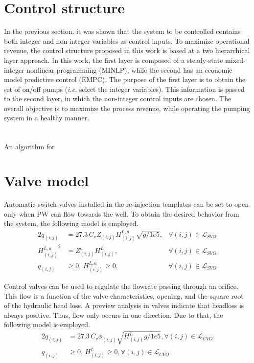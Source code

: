 \section{Control structure}
In the previous section, it was shown that the system to be controlled contains both integer and non-integer variables as control inputs. To maximize operational revenue, the control structure proposed in this work is based at a two hierarchical layer approach. In this work, the first layer is composed of a steady-state mixed-integer nonlinear programming (MINLP), while the second has an economic model predictive control (EMPC). The purpose of the first layer is to obtain the set of on/off pumps (\textit{i.e.} select the integer variables). This information is passed to the second layer, in which the non-integer control inputs are chosen. The overall objective is to maximize the process revenue, while operating the pumping system in a healthy manner. 
\section{}
An algorithm for 
\section{Valve model}
Automatic switch valves installed in the re-injection templates can be set to open only when PW can flow towards the well. To obtain the desired behavior from the system, the following model is employed.
\begin{alignat}{2}
    q_{(i,j)} &= 27.3 \, C_v Z_{(i,j)} H^{L,a}_{(i,j)} \sqrt{g/1e5}, &\forall (i,j)\in\mathcal{L}_{SVO}
    \\
    {H^{L,a}_{(i,j)}}^2 &= Z^a_{(i,j)} H^{L}_{(i,j)} , &\forall (i,j)\in\mathcal{L}_{SVO}
    \\
    q_{(i,j)} &\geq 0, \, H^{L,a}_{(i,j)} \geq 0, &\forall (i,j)\in\mathcal{L}_{SVO}
\end{alignat}

Control valves can be used to regulate the flowrate passing through an orifice. This flow is a function of the valve characteristics, opening, and the square root of the hydraulic head loss. A preview analysis in valves indicate that headloss is always positive. Thus, flow only occurs in one direction. Due to that, the following model is employed.
\begin{alignat}{2}
    q_{(i,j)} &= 27.3 \, C_v \phi_{(i,j)}  \sqrt{H^{L}_{(i,j)}g/1e5}, \forall (i,j)\in\mathcal{L}_{CVO}
    \\
    q_{(i,j)} &\geq 0, \, H^{L}_{(i,j)} \geq 0, \forall (i,j)\in\mathcal{L}_{CVO}
\end{alignat}




